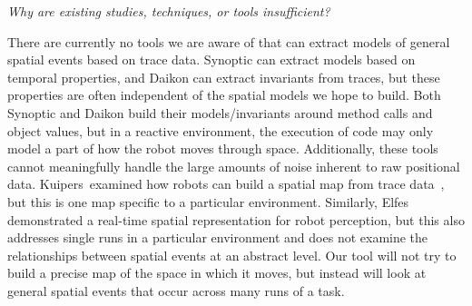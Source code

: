 \emph{Why are existing studies, techniques, or tools insufficient?}

There are currently no tools we are aware of that can extract models of general spatial events based on trace data. 
Synoptic can extract models based on temporal properties, and Daikon can extract invariants from traces, but these properties are often independent of the spatial models we hope to build.
Both Synoptic and Daikon build their models/invariants around method calls and object values, but in a reactive environment, the execution of code may only model a part of how the robot moves through space.
Additionally, these tools cannot meaningfully handle the large amounts of noise inherent to raw positional data.
Kuipers~\etal examined how robots can build a spatial map from trace data~\cite{kuipers1988robust}, but this is one map specific to a particular environment.
Similarly, Elfes~\cite{elfes2013occupancy} demonstrated a real-time spatial representation for robot perception, but this also addresses single runs in a particular environment and does not examine the relationships between spatial events at an abstract level.
Our tool will not try to build a precise map of the space in which it moves, but instead will look at general spatial events that occur across many runs of a task.
